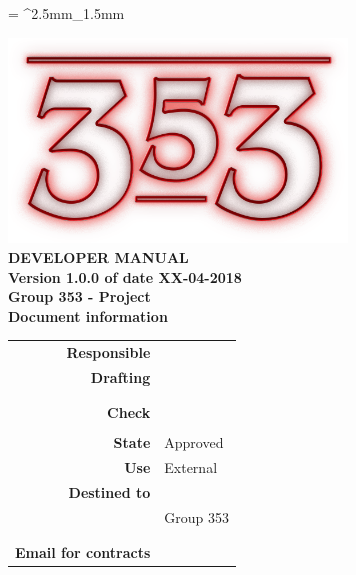 \documentclass[openany, a4paper, 12pt]{report}
\begin{document}
	
	\tabulinesep = ^2.5mm_1.5mm
	
	\begin{titlepage}
		\centering
		\vfill
		{
			\bfseries
			\vskip2cm
			\includegraphics[width=9cm]{../../common/images/logo.png} \\
			\vfill
			\Huge{DEVELOPER MANUAL}\\
			\vfill
			\Large Version 1.0.0 of date XX-04-2018\\ 
			\large Group 353 - Project \progetto \\
			\vfill
			\normalsize Document information\\
			\begin{table}[htbp]
				\centering
				\renewcommand\arraystretch{1.2}
				\begin{tabular}{r|l}
					\hline
					\textbf{Responsible}	& \Parwinder \\
					
					\textbf{Drafting} 		& \Elena \\
											& \Gianluca \\
											& \Valentina \\
											
					\textbf{Check} 			& \Riccardo \\	
											& \Davide \\
											
					\textbf{State} 			& Approved\\
					\textbf{Use}			& External\\
					\textbf{Destined to}   	& \Proponente\\
										& Group 353\\
										& \Vardanega\\
										& \Cardin\\
					
					\textbf{Email for contracts}	& \mailgroup
				\end{tabular}
			\end{table}
			\vfill
		}    
	\end{titlepage}
	
	\renewcommand{\contentsname}{Index}
	\tableofcontents
	\renewcommand{\listtablename}{List of Tables}
	\listoftables
	\newpage
	
	
	
	
	
	
\end{document}
